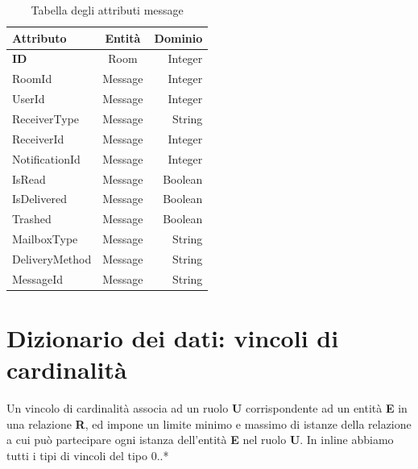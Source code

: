 \begin{table}[H]
	\centering
	\caption{Tabella degli attributi message}
	\begin{tabular}{l c r}
		\toprule
		Attributo & Entità & Dominio\\
		\midrule
		\textbf{ID} & Room & Integer \\
		RoomId & Message & Integer \\
		UserId & Message & Integer\\
		ReceiverType & Message & String\\
		ReceiverId & Message & Integer\\
		NotificationId & Message & Integer\\
		IsRead & Message & Boolean\\
		IsDelivered & Message & Boolean\\
		Trashed & Message & Boolean\\
		MailboxType & Message & String\\
		DeliveryMethod & Message & String\\
		MessageId & Message & String\\
		\bottomrule
	\end{tabular}
\end{table}

\section{Dizionario dei dati: vincoli di cardinalità}
Un vincolo di cardinalità associa ad un ruolo \textbf{U} corrispondente ad un entità \textbf{E} in una relazione \textbf{R}, ed impone un limite minimo e massimo di istanze della relazione a cui può partecipare ogni istanza dell'entità \textbf{E} nel ruolo \textbf{U}. In inline abbiamo tutti i tipi di vincoli del tipo 0..* 